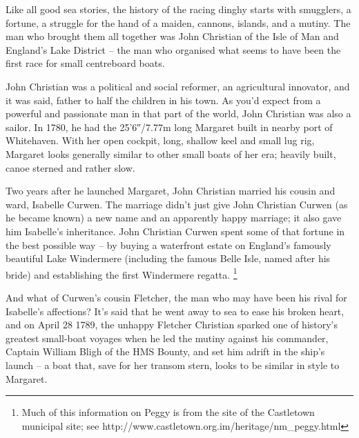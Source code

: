 \documentclass[
  letterpaper,
]{scrbook}
\begin{document}
Like all good sea stories, the history of the racing dinghy starts with
smugglers, a fortune, a struggle for the hand of a maiden, cannons,
islands, and a mutiny. The man who brought them all together was John
Christian of the Isle of Man and England's Lake District -- the man who
organised what seems to have been the first race for small centreboard
boats.

John Christian was a political and social reformer, an agricultural
innovator, and it was said, father to half the children in his town. As
you'd expect from a powerful and passionate man in that part of the
world, John Christian was also a sailor. In 1780, he had the 25'6″/7.77m
long Margaret built in nearby port of Whitehaven. With her open cockpit,
long, shallow keel and small lug rig, Margaret looks generally similar
to other small boats of her era; heavily built, canoe sterned and rather
slow.

Two years after he launched Margaret, John Christian married his cousin
and ward, Isabelle Curwen. The marriage didn't just give John Christian
Curwen (as he became known) a new name and an apparently happy marriage;
it also gave him Isabelle's inheritance. John Christian Curwen spent
some of that fortune in the best possible way -- by buying a waterfront
estate on England's famously beautiful Lake Windermere (including the
famous Belle Isle, named after his bride) and establishing the first
Windermere regatta. \footnote{Much of this information on Peggy is from
  the site of the Castletown municipal site; see
  http://www.castletown.org.im/heritage/nm\_peggy.html}

And what of Curwen's cousin Fletcher, the man who may have been his
rival for Isabelle's affections? It's said that he went away to sea to
ease his broken heart, and on April 28 1789, the unhappy Fletcher
Christian sparked one of history's greatest small-boat voyages when he
led the mutiny against his commander, Captain William Bligh of the HMS
Bounty, and set him adrift in the ship's launch -- a boat that, save for
her transom stern, looks to be similar in style to Margaret.
\end{document}
